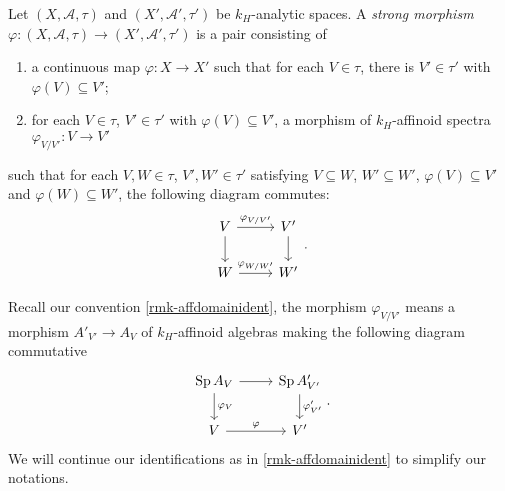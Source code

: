 \begin{definition}
    Let $(X,\mathcal{A},\tau)$ and $(X',\mathcal{A}',\tau')$ be $k_H$-analytic spaces. A \emph{strong morphism} $\varphi:(X,\mathcal{A},\tau)\rightarrow (X',\mathcal{A}',\tau')$ is a pair consisting of 
    \begin{enumerate}
        \item a continuous map $\varphi:X\rightarrow X'$ such that for each $V\in \tau$, there is $V'\in \tau'$ with $\varphi(V)\subseteq V'$;
        \item for each $V\in \tau$, $V'\in \tau'$ with $\varphi(V)\subseteq V'$, a morphism of $k_H$-affinoid spectra $\varphi_{V/V'}:V\rightarrow V'$ 
    \end{enumerate}
    such that for each $V,W\in \tau$, $V',W'\in \tau'$ satisfying $V\subseteq W$, $W'\subseteq W'$, $\varphi(V)\subseteq V'$ and $\varphi(W)\subseteq W'$, the following diagram commutes:
    \[
        \begin{tikzcd}
            V \arrow[r, "\varphi_{V/V'}"] \arrow[d] & V' \arrow[d] \\
            W \arrow[r, "\varphi_{W/W'}"]           & W'          
        \end{tikzcd}.    
    \]
\end{definition}
Recall our convention \cref{rmk-affdomainident}, the morphism $\varphi_{V/V'}$ means a morphism $A'_{V'}\rightarrow A_V$ of $k_H$-affinoid algebras making the following diagram commutative
\[
    \begin{tikzcd}
        \Sp A_V \arrow[d, "\varphi_V"] \arrow[r] & \Sp A'_{V'} \arrow[d, "\varphi'_{V'}"] \\
        V \arrow[r, "\varphi"]                   & V'                                    
    \end{tikzcd}.  
\]
We will continue our identifications as in \cref{rmk-affdomainident} to simplify our notations.

